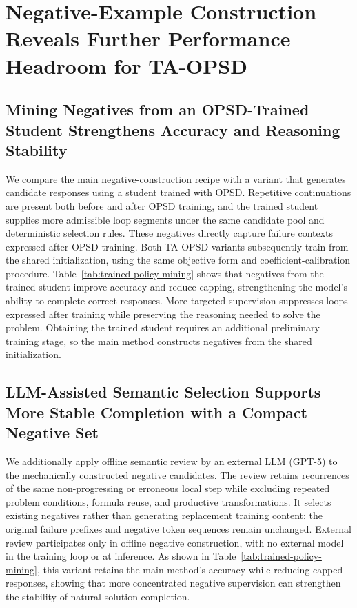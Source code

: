 \documentclass{article} %
\begin{document}
\section{Negative-Example Construction Reveals Further Performance Headroom for TA-OPSD}
\label{app:negative-selection-ablations}
\label{app:model-assisted-selection}

\subsection{Mining Negatives from an OPSD-Trained Student Strengthens Accuracy and Reasoning Stability}
\label{app:trained-student-negatives}

We compare the main negative-construction recipe with a variant that generates candidate responses using a student trained with OPSD. Repetitive continuations are present both before and after OPSD training, and the trained student supplies more admissible loop segments under the same candidate pool and deterministic selection rules. These negatives directly capture failure contexts expressed after OPSD training. Both TA-OPSD variants subsequently train from the shared initialization, using the same objective form and coefficient-calibration procedure. Table~\ref{tab:trained-policy-mining} shows that negatives from the trained student improve accuracy and reduce capping, strengthening the model's ability to complete correct responses. More targeted supervision suppresses loops expressed after training while preserving the reasoning needed to solve the problem. Obtaining the trained student requires an additional preliminary training stage, so the main method constructs negatives from the shared initialization.


\subsection{LLM-Assisted Semantic Selection Supports More Stable Completion with a Compact Negative Set}
\label{app:semantic-negative-selection}

We additionally apply offline semantic review by an external LLM (GPT-5) to the mechanically constructed negative candidates. The review retains recurrences of the same non-progressing or erroneous local step while excluding repeated problem conditions, formula reuse, and productive transformations. It selects existing negatives rather than generating replacement training content: the original failure prefixes and negative token sequences remain unchanged. External review participates only in offline negative construction, with no external model in the training loop or at inference. As shown in Table~\ref{tab:trained-policy-mining}, this variant retains the main method's accuracy while reducing capped responses, showing that more concentrated negative supervision can strengthen the stability of natural solution completion.
\end{document}
